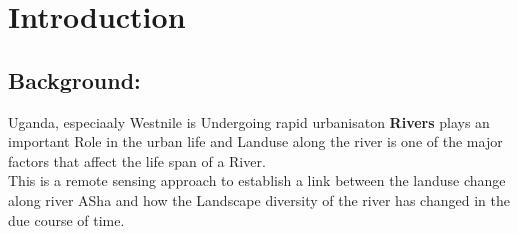 \documentclass[12pt, a4paper, oneside]{thesis}
\begin{document}
\clearpage
\mainmatter

\chapter{Introduction}
\section{Background:}

Uganda, especiaaly Westnile is Undergoing rapid urbanisaton \textbf{Rivers}  plays an important Role in the urban life and Landuse along the river is one of the major factors that affect the life span of a River.\citep{miguez2012sustainable}\\
This is a remote sensing approach to establish a link between the landuse change along river ASha and how the Landscape diversity  of the river has changed in the due course of time.
% 




\end{document}
